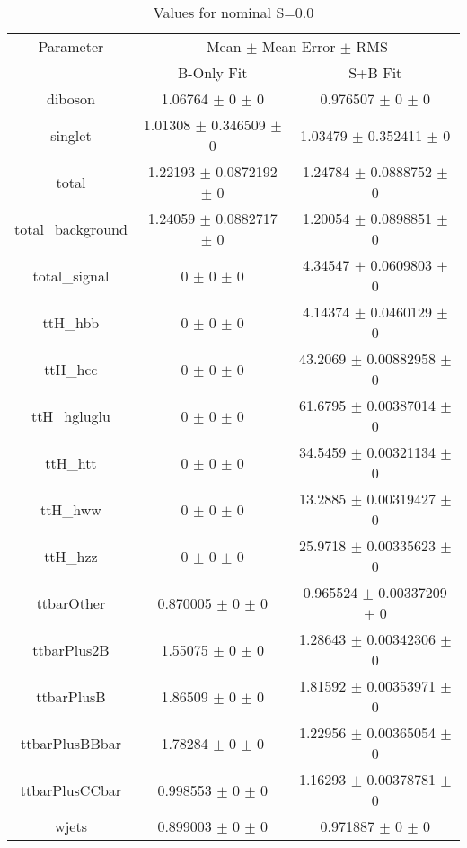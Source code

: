 \begin{table}
\centering
\caption{Values for nominal S=0.0}
\begin{tabular}{ccc}
\toprule
Parameter & \multicolumn{2}{c}{Mean $\pm$ Mean Error $\pm$ RMS}\\
 & B-Only Fit & S+B Fit\\
\midrule
diboson & \num{1.06764} $\pm$ \num{0} $\pm$ \num{0} & \num{0.976507} $\pm$ \num{0} $\pm$ \num{0}\\
singlet & \num{1.01308} $\pm$ \num{0.346509} $\pm$ \num{0} & \num{1.03479} $\pm$ \num{0.352411} $\pm$ \num{0}\\
total & \num{1.22193} $\pm$ \num{0.0872192} $\pm$ \num{0} & \num{1.24784} $\pm$ \num{0.0888752} $\pm$ \num{0}\\
total\_background & \num{1.24059} $\pm$ \num{0.0882717} $\pm$ \num{0} & \num{1.20054} $\pm$ \num{0.0898851} $\pm$ \num{0}\\
total\_signal & \num{0} $\pm$ \num{0} $\pm$ \num{0} & \num{4.34547} $\pm$ \num{0.0609803} $\pm$ \num{0}\\
ttH\_hbb & \num{0} $\pm$ \num{0} $\pm$ \num{0} & \num{4.14374} $\pm$ \num{0.0460129} $\pm$ \num{0}\\
ttH\_hcc & \num{0} $\pm$ \num{0} $\pm$ \num{0} & \num{43.2069} $\pm$ \num{0.00882958} $\pm$ \num{0}\\
ttH\_hgluglu & \num{0} $\pm$ \num{0} $\pm$ \num{0} & \num{61.6795} $\pm$ \num{0.00387014} $\pm$ \num{0}\\
ttH\_htt & \num{0} $\pm$ \num{0} $\pm$ \num{0} & \num{34.5459} $\pm$ \num{0.00321134} $\pm$ \num{0}\\
ttH\_hww & \num{0} $\pm$ \num{0} $\pm$ \num{0} & \num{13.2885} $\pm$ \num{0.00319427} $\pm$ \num{0}\\
ttH\_hzz & \num{0} $\pm$ \num{0} $\pm$ \num{0} & \num{25.9718} $\pm$ \num{0.00335623} $\pm$ \num{0}\\
ttbarOther & \num{0.870005} $\pm$ \num{0} $\pm$ \num{0} & \num{0.965524} $\pm$ \num{0.00337209} $\pm$ \num{0}\\
ttbarPlus2B & \num{1.55075} $\pm$ \num{0} $\pm$ \num{0} & \num{1.28643} $\pm$ \num{0.00342306} $\pm$ \num{0}\\
ttbarPlusB & \num{1.86509} $\pm$ \num{0} $\pm$ \num{0} & \num{1.81592} $\pm$ \num{0.00353971} $\pm$ \num{0}\\
ttbarPlusBBbar & \num{1.78284} $\pm$ \num{0} $\pm$ \num{0} & \num{1.22956} $\pm$ \num{0.00365054} $\pm$ \num{0}\\
ttbarPlusCCbar & \num{0.998553} $\pm$ \num{0} $\pm$ \num{0} & \num{1.16293} $\pm$ \num{0.00378781} $\pm$ \num{0}\\
wjets & \num{0.899003} $\pm$ \num{0} $\pm$ \num{0} & \num{0.971887} $\pm$ \num{0} $\pm$ \num{0}\\
\bottomrule
\end{tabular}
\end{table}